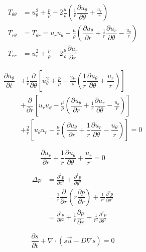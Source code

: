 \documentclass{article}
\numberwithin{equation}{section}
\newcommand{\pd}[2]{\dfrac{\partial #1}{\partial #2}}
\begin{document}
\begin{align*}
    T_{\theta \theta} &=
    u_\theta^2
    + \frac{p}{\rho}
    - 2\frac{\mu}{\rho} \left(
        \frac1r \pd{u_\theta}{\theta} + \frac{u_r}{r}
    \right) \\
    T_{r \theta} &= T_{\theta r} = u_r u_\theta - \frac{\mu}{\rho} \left(
        \pd{u_\theta}{r} + \frac1r \pd{u_r}{\theta} - \frac{u_\theta}{r}
    \right) \\
    T_{rr} &= u_r^2 + \frac{p}{\rho} - 2\frac{\mu}{\rho} \pd{u_r}{r}
\end{align*}

\begin{equation}
    \begin{aligned}
        \pd{u_\theta}{t} &+
        \frac1r \pd{}{\theta} \left[
            u_\theta^2 +
            \frac{p}{\rho} -
            \frac{2\mu}{\rho} \left(\dfrac1r \pd{u_\theta}{\theta} + \dfrac{u_r}{r}\right)
        \right] \\ &+
        \pd{}{r} \left[
            u_r u_\theta -
            \frac{\mu}{\rho} \left(
                \pd{u_\theta}{r} + \frac1r \pd{u_r}{\theta} - \frac{u_\theta}{r}
            \right)
        \right] \\ &+
        \frac2r \left[
            u_\theta u_r - \frac{\mu}{\rho}\left(\pd{u_\theta}{r} + \dfrac1r \pd{u_r}{\theta} - \dfrac{u_\theta}{r}\right)
        \right]
        = 0
    \end{aligned}
\end{equation}

\begin{equation}
    \pd{u_r}{r} + \frac1r \pd{u_\theta}{\theta} + \frac{u_r}{r} = 0
\end{equation}

\begin{equation}
    \begin{aligned}
        \Delta p &= \frac{\partial^2 p}{\partial x^2} + \frac{\partial^2 p}{\partial y^2} \\
        &= \frac1r \pd{}{r} \left(r \pd{p}{r}\right) + \frac{1}{r^2} \frac{\partial^2 p}{\partial \theta^2} \\
        &= \frac{\partial^2 p}{\partial r^2} +
        \frac1r \pd{p}{r} +
        \frac{1}{r^2} \frac{\partial^2 p}{\partial \theta^2}
    \end{aligned}
\end{equation}

\begin{equation}
    \pd{s}{t} + \nabla \cdot \left(s \vec{u} - D \nabla s\right) = 0
\end{equation}
\end{document}
